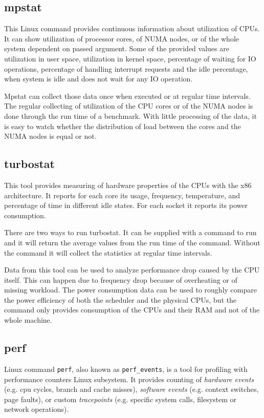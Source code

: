 \subsection{mpstat}
This Linux command provides continuous information about utilization of CPUs. It
can show utilization of processor cores, of NUMA nodes, or of the whole system
dependent on passed argument. Some of the provided values are utilization in
user space, utilization in kernel space, percentage of waiting for IO
operations, percentage of handling interrupt requests and the idle percentage,
when system is idle and does not wait for any IO operation.

Mpstat can collect those data once when executed or at regular time intervals.
The regular collecting of utilization of the CPU cores or of the NUMA nodes is
done through the run time of a benchmark. With little processing of the data, it
is easy to watch whether the distribution of load between the cores and the NUMA
nodes is equal or not.

\subsection{turbostat}
This tool provides measuring of hardware properties of the CPUs with the x86
architecture. It reports for each core its usage, frequency, temperature, and
percentage of time in different idle states. For each socket it reports its
power consumption.

There are two ways to run turbostat. It can be supplied with a command to run
and it will return the average values from the run time of the command. Without
the command it will collect the statistics at regular time intervals.

Data from this tool can be used to analyze performance drop caused by the CPU
itself. This can happen due to frequency drop because of overheating or of
missing workload. The power consumption data can be used to roughly compare the
power efficiency of both the scheduler and the physical CPUs, but the command
only provides consumption of the CPUs and their RAM and not of the whole
machine.

\subsection{perf}
Linux command \texttt{perf}, also known as \texttt{perf\_events}, is a tool for
profiling with performance counters Linux subsystem. It provides counting of
\emph{hardware events} (e.g. cpu cycles, branch and cache misses),
\emph{software events} (e.g. context switches, page faults), or custom
\emph{tracepoints} (e.g. specific system calls, filesystem or network
operations).

